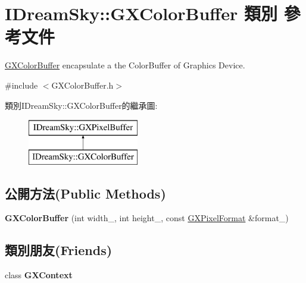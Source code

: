 \hypertarget{class_i_dream_sky_1_1_g_x_color_buffer}{}\section{I\+Dream\+Sky\+:\+:G\+X\+Color\+Buffer 類別 參考文件}
\label{class_i_dream_sky_1_1_g_x_color_buffer}


\hyperlink{class_i_dream_sky_1_1_g_x_color_buffer}{G\+X\+Color\+Buffer} encapsulate a the Color\+Buffer of Graphics Device.  




{\ttfamily \#include $<$G\+X\+Color\+Buffer.\+h$>$}

類別\+I\+Dream\+Sky\+:\+:G\+X\+Color\+Buffer的繼承圖\+:\begin{figure}[H]
\begin{center}
\leavevmode
\includegraphics[height=2.000000cm]{class_i_dream_sky_1_1_g_x_color_buffer}
\end{center}
\end{figure}
\subsection*{公開方法(Public Methods)}
\begin{DoxyCompactItemize}
\item 
{\bfseries G\+X\+Color\+Buffer} (int width\+\_\+, int height\+\_\+, const \hyperlink{class_i_dream_sky_1_1_g_x_pixel_format}{G\+X\+Pixel\+Format} \&format\+\_\+)\hypertarget{class_i_dream_sky_1_1_g_x_color_buffer_ab2664f51f83c5ccb3d8404c907ee44c5}{}\label{class_i_dream_sky_1_1_g_x_color_buffer_ab2664f51f83c5ccb3d8404c907ee44c5}

\end{DoxyCompactItemize}
\subsection*{類別朋友(Friends)}
\begin{DoxyCompactItemize}
\item 
class {\bfseries G\+X\+Context}\hypertarget{class_i_dream_sky_1_1_g_x_color_buffer_a2c36d7f8865080802bbad88cd73d871c}{}\label{class_i_dream_sky_1_1_g_x_color_buffer_a2c36d7f8865080802bbad88cd73d871c}

\end{DoxyCompactItemize}
